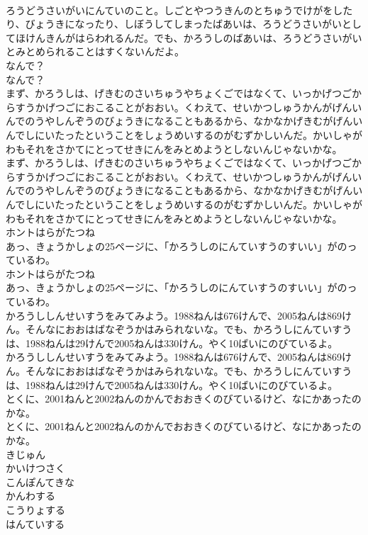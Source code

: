 \documentclass[8pt]{extreport}
\begin{document}
\begin{CJK}{UTF8}{min}
\\	ろうどうさいがいにんていのこと。しごとやつうきんのとちゅうでけがをしたり、びょうきになったり、しぼうしてしまったばあいは、ろうどうさいがいとしてほけんきんがはらわれるんだ。でも、かろうしのばあいは、ろうどうさいがいとみとめられることはすくないんだよ。
\\	なんで？
\\	なんで？
\\	まず、かろうしは、げきむのさいちゅうやちょくごではなくて、いっかげつごからすうかげつごにおこることがおおい。くわえて、せいかつしゅうかんがげんいんでのうやしんぞうのびょうきになることもあるから、なかなかげきむがげんいんでしにいたったということをしょうめいするのがむずかしいんだ。かいしゃがわもそれをさかてにとってせきにんをみとめようとしないんじゃないかな。
\\	まず、かろうしは、げきむのさいちゅうやちょくごではなくて、いっかげつごからすうかげつごにおこることがおおい。くわえて、せいかつしゅうかんがげんいんでのうやしんぞうのびょうきになることもあるから、なかなかげきむがげんいんでしにいたったということをしょうめいするのがむずかしいんだ。かいしゃがわもそれをさかてにとってせきにんをみとめようとしないんじゃないかな。
\\	ホントはらがたつね
\\	あっ、きょうかしょの25ページに、「かろうしのにんていすうのすいい」がのっているわ。
\\	ホントはらがたつね
\\	あっ、きょうかしょの25ページに、「かろうしのにんていすうのすいい」がのっているわ。
\\	かろうししんせいすうをみてみよう。1988ねんは676けんで、2005ねんは869けん。そんなにおおはばなぞうかはみられないな。でも、かろうしにんていすうは、1988ねんは29けんで2005ねんは330けん。やく10ばいにのびているよ。
\\	かろうししんせいすうをみてみよう。1988ねんは676けんで、2005ねんは869けん。そんなにおおはばなぞうかはみられないな。でも、かろうしにんていすうは、1988ねんは29けんで2005ねんは330けん。やく10ばいにのびているよ。
\\	とくに、2001ねんと2002ねんのかんでおおきくのびているけど、なにかあったのかな。
\\	とくに、2001ねんと2002ねんのかんでおおきくのびているけど、なにかあったのかな。
\\	きじゅん
\\	かいけつさく
\\	こんぽんてきな
\\	かんわする
\\	こうりょする
\\	はんていする

\end{CJK}
\end{document}
